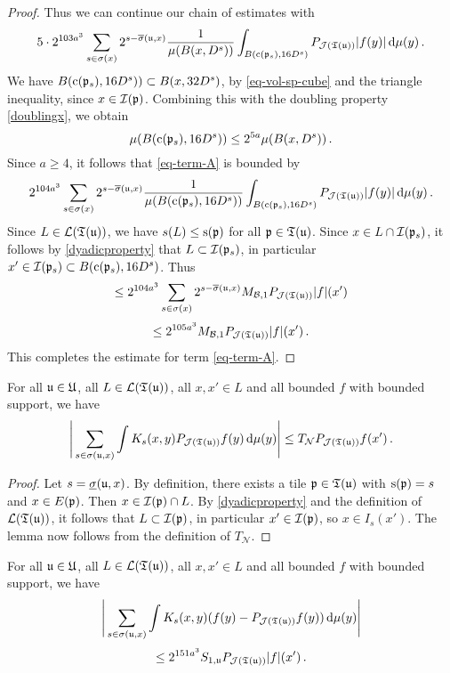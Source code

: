 {\begin{proof}
    Thus we can continue our chain of estimates with
    $$
        5\cdot 2^{103a^3} \sum_{s\in\sigma(x)}2^{s - \overline{\sigma}({\mathfrak u}, x)} \frac{1}{\mu(B(x,D^s))}\int_{B({\mathrm{c}}({\mathfrak p}_s),16 D^s)}P_{\mathcal{J}({\mathfrak T}({\mathfrak u}))}|f(y)|\,\mathrm{d}\mu(y)\,.
    $$
    We have $B({\mathrm{c}}({\mathfrak p}_s), 16D^s)) \subset B(x, 32D^s)$, by \eqref{eq-vol-sp-cube} and the triangle inequality, since $x \in {\mathcal{I}}({\mathfrak p})$. Combining this with the doubling property \eqref{doublingx}, we obtain
    $$
        \mu(B({\mathrm{c}}({\mathfrak p}_s), 16D^s)) \le 2^{5a} \mu(B(x, D^s))\,.
    $$
    Since $a \ge 4$, it follows that \eqref{eq-term-A} is bounded by
    $$
        2^{104a^3} \sum_{s\in\sigma(x)}2^{s - \overline{\sigma}({\mathfrak u}, x)} \frac{1}{\mu(B({\mathrm{c}}({\mathfrak p}_s),16D^s))}\int_{B({\mathrm{c}}({\mathfrak p}_s),16D^s)}P_{\mathcal{J}({\mathfrak T}({\mathfrak u}))}|f(y)|\,\mathrm{d}\mu(y)\,.
    $$
    Since $L \in \mathcal{L}({\mathfrak T}({\mathfrak u}))$, we have $s(L) \le {\mathrm{s}}({\mathfrak p})$ for all ${\mathfrak p} \in {\mathfrak T}({\mathfrak u})$. Since $x\in L \cap {\mathcal{I}}({\mathfrak p}_s)$, it follows by \eqref{dyadicproperty} that $L \subset {\mathcal{I}}({\mathfrak p}_s)$, in particular $x' \in {\mathcal{I}}({\mathfrak p}_s) \subset B({\mathrm{c}}({\mathfrak p}_s), 16D^s)$. Thus
    $$
        \le 2^{104a^3} \sum_{s\in\sigma(x)}2^{s - \overline{\sigma}({\mathfrak u}, x)} M_{\mathcal{B}, 1}P_{\mathcal{J}({\mathfrak T}({\mathfrak u}))}|f|(x')
    $$
    $$
        \le 2^{105a^3} M_{\mathcal{B}, 1}P_{\mathcal{J}({\mathfrak T}({\mathfrak u}))}|f|(x')\,.
    $$
    This completes the estimate for term \eqref{eq-term-A}.
\end{proof}

\begin{lemma}
    \label{second-tree-pointwise}
    For all ${\mathfrak u} \in {\mathfrak U}$, all $L \in \mathcal{L}({\mathfrak T}({\mathfrak u}))$, all $x, x' \in L$ and all bounded $f$ with bounded support, we have
    $$
         \Bigg| \sum_{s \in \sigma({\mathfrak u}, x)} \int K_s(x,y) P_{\mathcal{J}({\mathfrak T}({\mathfrak u}))} f(y) \, \mathrm{d}\mu(y) \Bigg| \le T_{\mathcal{N}} P_{\mathcal{J}({\mathfrak T}({\mathfrak u}))} f(x')\,.
    $$
\end{lemma}

\begin{proof}
    Let $s = \underline{\sigma}({\mathfrak u}, x)$. By definition, there exists a tile ${\mathfrak p} \in {\mathfrak T}({\mathfrak u})$ with ${\mathrm{s}}({\mathfrak p}) = s$ and $x \in E({\mathfrak p})$. Then $x \in {\mathcal{I}}({\mathfrak p}) \cap L$. By \eqref{dyadicproperty} and the definition of $\mathcal{L}({\mathfrak T}({\mathfrak u}))$, it follows that $L \subset {\mathcal{I}}({\mathfrak p})$, in particular $x' \in {\mathcal{I}}({\mathfrak p})$, so $x \in I_s(x')$.
    The lemma now follows from the definition of $T_{\mathcal{N}}$.
\end{proof}

\begin{lemma}
    \label{third-tree-pointwise}
    For all ${\mathfrak u} \in {\mathfrak U}$, all $L \in \mathcal{L}({\mathfrak T}({\mathfrak u}))$, all $x, x' \in L$ and all bounded $f$ with bounded support, we have
    \begin{equation*}
        \Bigg| \sum_{s \in \sigma({\mathfrak u}, x)} \int K_s(x,y) (f(y) - P_{\mathcal{J}({\mathfrak T}({\mathfrak u}))} f(y)) \, \mathrm{d}\mu(y) \Bigg|
    \end{equation*}
    \begin{equation*}
          \le 2^{151a^3} S_{1,{\mathfrak u}} P_{\mathcal{J}({\mathfrak T}({\mathfrak u}))}|f|(x')\,.
    \end{equation*}
\end{lemma}

}
